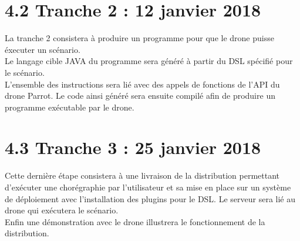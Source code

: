 \documentclass{article}
\begin{document}
\section*{4.2 Tranche 2  : 12 janvier 2018}
\normalsize
\vspace{1\baselineskip}

La tranche 2 consistera \`a produire un programme pour que le drone puisse \'executer un sc\'enario.\\
Le langage cible JAVA du programme sera g\'en\'er\'e \`a partir du DSL sp\'ecifi\'e pour le sc\'enario.\\
L'ensemble des instructions sera li\'e avec des appels de fonctions de l'API du drone Parrot. Le code ainsi g\'en\'er\'e sera ensuite compil\'e afin de produire un programme ex\'ecutable par le drone.

\section*{4.3 Tranche 3 : 25 janvier 2018}
\normalsize
\vspace{1\baselineskip}

Cette derni\`ere \'etape consistera \`a une livraison de la distribution permettant d'ex\'ecuter une chor\'egraphie par l'utilisateur et sa mise en place sur un syst\`eme de d\'eploiement avec l'installation des plugins pour le DSL.
Le serveur sera li\'e au drone qui ex\'ecutera le sc\'enario. \\
Enfin une d\'emonstration avec le drone illustrera le fonctionnement de la distribution.
\end{document}
